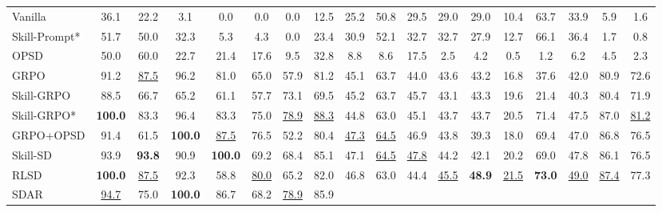 \begin{table}[ht!]
{\begin{tabular}{l ccccccc cccccccc cc}
    Vanilla
        & 36.1 & 22.2 & 3.1 & 0.0 & 0.0 & 0.0 & 12.5
        & 25.2 & 50.8 & 29.5 & 29.0 & 29.0 & 10.4 & 63.7 & 33.9
        & 5.9 & 1.6
        \\
    Skill-Prompt*
        & 51.7 & 50.0 & 32.3 & 5.3 & 4.3 & 0.0 & 23.4
        & 30.9 & 52.1 & 32.7 & 32.7 & 27.9 & 12.7 & 66.1 & 36.4
        & 1.7 & 0.8
        \\
    OPSD
        & 50.0 & 60.0 & 22.7 & 21.4 & 17.6 & 9.5 & 32.8
        & 8.8 & 8.6 & 17.5 & 2.5 & 4.2 & 0.5 & 1.2 & 6.2
        & 4.5 & 2.3
        \\
    GRPO
        & 91.2 & \cellcolor{secondcolor}\underline{87.5} & 96.2 & 81.0 & 65.0 & 57.9 & 81.2
        & 45.1 & 63.7 & 44.0 & 43.6 & 43.2 & 16.8 & 37.6 & 42.0
        & 80.9 & 72.6
        \\
    Skill-GRPO
        & 88.5 & 66.7 & 65.2 & 61.1 & 57.7 & 73.1 & 69.5
        & 45.2 & 63.7 & 45.7 & 43.1 & 43.3 & 19.6 & 21.4 & 40.3
        & 80.4 & 71.9
        \\
    Skill-GRPO*
        & \cellcolor{topcolor}\textbf{100.0} & 83.3 & 96.4 & 83.3 & 75.0 & \cellcolor{secondcolor}\underline{78.9} & \cellcolor{secondcolor}\underline{88.3}
        & 44.8 & 63.0 & 45.1 & 43.7 & 43.7 & 20.5 & 71.4 & 47.5
        & 87.0 & \cellcolor{secondcolor}\underline{81.2}
        \\
    GRPO+OPSD
        & 91.4 & 61.5 & \cellcolor{topcolor}\textbf{100.0} & \cellcolor{secondcolor}\underline{87.5} & 76.5 & 52.2 & 80.4
        & \cellcolor{secondcolor}\underline{47.3} & \cellcolor{secondcolor}\underline{64.5} & 46.9 & 43.8 & 39.3 & 18.0 & 69.4 & 47.0
        & 86.8 & 76.5
        \\
    Skill-SD
        & 93.9 & \cellcolor{topcolor}\textbf{93.8} & 90.9 & \cellcolor{topcolor}\textbf{100.0} & 69.2 & 68.4 & 85.1
        & 47.1 & \cellcolor{secondcolor}\underline{64.5} & \cellcolor{secondcolor}\underline{47.8} & 44.2 & 42.1 & 20.2 & 69.0 & 47.8
        & 86.1 & 76.5
        \\
    RLSD
        & \cellcolor{topcolor}\textbf{100.0} & \cellcolor{secondcolor}\underline{87.5} & 92.3 & 58.8 & \cellcolor{secondcolor}\underline{80.0} & 65.2 & 82.0
        & 46.8 & 63.0 & 44.4 & \cellcolor{secondcolor}\underline{45.5} & \cellcolor{topcolor}\textbf{48.9} & \cellcolor{secondcolor}\underline{21.5} & \cellcolor{topcolor}\textbf{73.0} & \cellcolor{secondcolor}\underline{49.0}
        & \cellcolor{secondcolor}\underline{87.4} & 77.3
        \\
    SDAR
        & \cellcolor{secondcolor}\underline{94.7} & 75.0 & \cellcolor{topcolor}\textbf{100.0} & 86.7 & 68.2 & \cellcolor{secondcolor}\underline{78.9} & 85.9

\end{tabular}}
\end{table}
